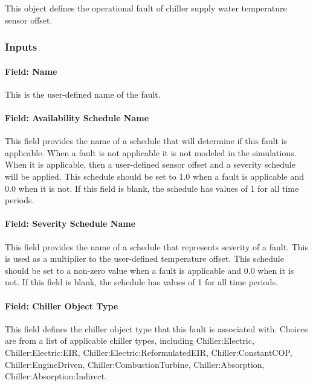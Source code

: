 This object defines the operational fault of chiller supply water temperature sensor offset.

\subsubsection{Inputs}

\paragraph{Field: Name}

This is the user-defined name of the fault.

\paragraph{Field: Availability Schedule Name}

This field provides the name of a schedule that will determine if this fault is applicable. When a fault is not applicable it is not modeled in the simulations. When it is applicable, then a user-defined sensor offset and a severity schedule will be applied. This schedule should be set to 1.0 when a fault is applicable and 0.0 when it is not. If this field is blank, the schedule has values of 1 for all time periods.

\paragraph{Field: Severity Schedule Name}\label{field-severity-schedule-name}

This field provides the name of a schedule that represents severity of a fault. This is used as a multiplier to the user-defined temperature offset. This schedule should be set to a non-zero value when a fault is applicable and 0.0 when it is not. If this field is blank, the schedule has values of 1 for all time periods.

\paragraph{Field: Chiller Object Type}\label{field-chiller-object-type}

This field defines the chiller object type that this fault is associated with. Choices are from a list of applicable chiller types, including Chiller:Electric, Chiller:Electric:EIR, Chiller:Electric:ReformulatedEIR,  Chiller:ConstantCOP, Chiller:EngineDriven, Chiller:CombustionTurbine, Chiller:Absorption, Chiller:Absorption:Indirect.

